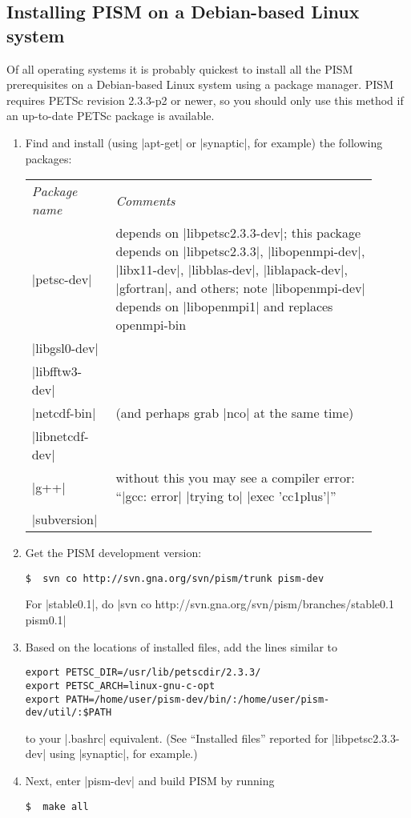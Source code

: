 \documentclass[11pt,final]{amsart}
\newcommand{\PETSCREL}{2.3.3-p2}
\begin{document}
\clearpage
\subsection{Installing PISM on a Debian-based Linux system} \label{subsec:debian}
Of all operating systems it is probably quickest to install all the PISM prerequisites on a Debian-based Linux system using a package manager.  PISM requires PETSc revision \PETSCREL{} or newer, so you should only use this method if an up-to-date PETSc package is available.

\begin{enumerate}
\item Find and install (using |apt-get| or |synaptic|, for example) the following packages:
  \begin{center}
    \begin{tabular*}{0.9\linewidth}{p{0.2\linewidth}p{0.7\linewidth}}
      \hline
      \emph{Package name} & \emph{Comments}\\
      |petsc-dev| & depends on |libpetsc2.3.3-dev|; this package 
      depends on |libpetsc2.3.3|, |libopenmpi-dev|, |libx11-dev|,
      |libblas-dev|, |liblapack-dev|, |gfortran|, and others; 
      note |libopenmpi-dev| depends on |libopenmpi1| and
      replaces openmpi-bin\\
      |libgsl0-dev| & \\
      |libfftw3-dev| & \\
      |netcdf-bin| & (and perhaps grab |nco| at the same time)\\
      |libnetcdf-dev| & \\
      |g++| & without this you may see a compiler error: ``|gcc: error| |trying to| |exec 'cc1plus'|''\\
      |subversion| & \\
      \hline
    \end{tabular*}
  \end{center}
\item Get the PISM development version:
\begin{verbatim}
$  svn co http://svn.gna.org/svn/pism/trunk pism-dev
\end{verbatim}
\noindent For |stable0.1|, do \quad\small |svn co http://svn.gna.org/svn/pism/branches/stable0.1 pism0.1|
\item Based on the locations of installed files, add the lines similar to
\begin{verbatim}
export PETSC_DIR=/usr/lib/petscdir/2.3.3/
export PETSC_ARCH=linux-gnu-c-opt
export PATH=/home/user/pism-dev/bin/:/home/user/pism-dev/util/:$PATH
\end{verbatim}
to your |.bashrc| equivalent.  (See ``Installed files'' reported for |libpetsc2.3.3-dev| using |synaptic|, for example.)
\item Next, enter |pism-dev| and build PISM by running
\begin{verbatim}
$  make all
\end{verbatim}
\end{enumerate}
\end{document}
